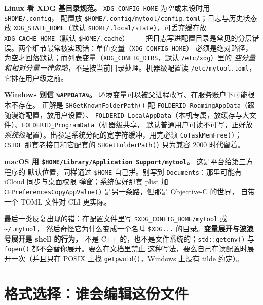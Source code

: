 \documentclass[12pt,a4paper,fontset=fandol]{ctexbook}
\newcommand{\Fn}[1]{\texttt{#1()}}
\newcommand{\Tp}[1]{\texttt{#1}}
\newcommand{\Bk}{\allowbreak}
\begin{document}
\textbf{Linux 看 XDG 基目录规范。} \Tp{XDG\_CONFIG\_HOME} 为空或未设时用 \Tp{\$HOME\Bk/.config}，
配置放 \Tp{\$HOME/.config\Bk/mytool\Bk/config.toml}；日志与历史状态放 \Tp{XDG\_STATE\_HOME}（默认
\Tp{\$HOME/.local\Bk/state}），可丢弃缓存放 \Tp{XDG\_CACHE\_HOME}（默认 \Tp{\$HOME/.cache}）——
把日志写进配置目录是常见的分层错误。两个细节最常被实现错：单值变量（\Tp{XDG\_CONFIG\_HOME}）
必须是绝对路径，为空才回落默认；而列表变量（\Tp{XDG\_CONFIG\_DIRS}，默认 \Tp{/etc/xdg}）里的
\emph{空分量和相对分量一律忽略}，不是按当前目录处理。机器级配置读 \Tp{/etc/mytool.toml}，
它排在用户级之前。

\textbf{Windows 别信 \Tp{\%APPDATA\%}。} 环境变量可以被父进程改写、在服务账户下可能根本不存在。
正解是 \Fn{SHGetKnownFolderPath} 配 \Tp{FOLDERID\_RoamingAppData}（跟随漫游配置，放用户设置）、
\Tp{FOLDERID\_LocalAppData}（本机专属，放缓存与大文件）、\Tp{FOLDERID\_ProgramData}（机器级共享，
默认普通用户可读不可写，正好放\emph{系统级}配置）。出参是系统分配的宽字符缓冲，用完必须
\Fn{CoTaskMemFree}；\Tp{CSIDL} 那套老接口和它配套的 \Fn{SHGetFolderPath} 只为兼容 2000 时代留着。

\textbf{macOS 用 \Tp{\$HOME/Library/Application Support/mytool}。} 这是平台给第三方程序的
默认位置，同样通过 \Tp{\$HOME} 自己拼。别写到 \Tp{Documents}：那里可能有 iCloud 同步与桌面权限
弹窗；系统偏好那套 plist 加 \Fn{CFPreferencesCopyAppValue} 是另一条路，但那是 Objective-C 的世界，
自带一个 TOML 文件对 CLI 更实际。

最后一类反复出现的错：在配置文件里写 \Tp{\$XDG\_CONFIG\_HOME/mytool} 或 \Tp{\textasciitilde/.mytool}，
然后奇怪它为什么变成一个名叫 \Tp{\$XDG...} 的目录。\textbf{变量展开与波浪号展开是 shell 的行为，}
不是 C++ 的，也不是文件系统的；\Fn{std::getenv} 与 \Fn{fopen} 都不会替你展开。要么在文档里禁止
这种写法，要么自己在读配置时展开一次（并且只在 POSIX 上找 \Fn{getpwuid}，Windows 上没有 tilde
约定）。

\section{格式选择：谁会编辑这份文件}
\end{document}
